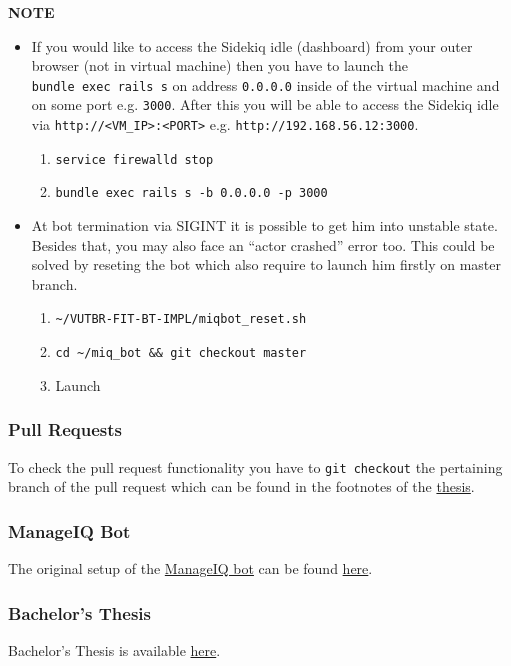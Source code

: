 \textbf{NOTE}

\begin{itemize}
\tightlist
\item
  If you would like to access the Sidekiq idle (dashboard) from your
  outer browser (not in virtual machine) then you have to launch the
  \texttt{bundle\ exec\ rails\ s} on address \texttt{0.0.0.0} inside of
  the virtual machine and on some port e.g. \texttt{3000}. After this
  you will be able to access the Sidekiq idle via
  \texttt{http://\textless{}VM\_IP\textgreater{}:\textless{}PORT\textgreater{}}
  e.g. \texttt{http://192.168.56.12:3000}.

  \begin{enumerate}
  \def\labelenumi{\arabic{enumi}.}
  \tightlist
  \item
    \texttt{service\ firewalld\ stop}
  \item
    \texttt{bundle\ exec\ rails\ s\ -b\ 0.0.0.0\ -p\ 3000}
  \end{enumerate}
\item
  At bot termination via SIGINT it is possible to get him into unstable
  state. Besides that, you may also face an ``actor crashed'' error too.
  This could be solved by reseting the bot which also require to launch
  him firstly on master branch.

  \begin{enumerate}
  \def\labelenumi{\arabic{enumi}.}
  \tightlist
  \item
    \texttt{\textasciitilde{}/VUTBR-FIT-BT-IMPL/miqbot\_reset.sh}
  \item
    \texttt{cd\ \textasciitilde{}/miq\_bot\ \&\&\ git\ checkout\ master}
  \item
    Launch
  \end{enumerate}
\end{itemize}

\subsubsection{Pull Requests}\label{pull-requests}

To check the pull request functionality you have to
\texttt{git\ checkout} the pertaining branch of the pull request which
can be found in the footnotes of the
\href{https://github.com/europ/VUTBR-FIT-BT/blob/master/PDF/thesis.pdf}{thesis}.

\subsubsection{ManageIQ Bot}\label{manageiq-bot}

The original setup of the
\href{https://github.com/ManageIQ/miq_bot}{ManageIQ bot} can be found
\href{https://github.com/ManageIQ/miq_bot\#development}{here}.

\subsubsection{Bachelor's Thesis}\label{bachelors-thesis}

Bachelor's Thesis is available
\href{https://github.com/europ/VUTBR-FIT-BT}{here}.
